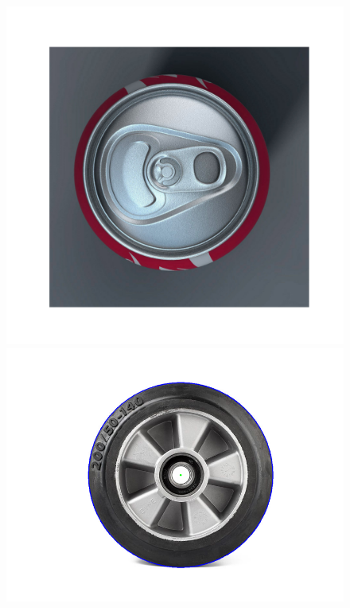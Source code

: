 \documentclass[a4paper,12pt]{article}
\begin{document}
\begin{figure}[H]
    \centering
    \begin{minipage}{0.48\textwidth}
        \centering
        \includegraphics[width=\textwidth]{images/hough_circles/1_orig_range.png}
    \end{minipage}
    \begin{minipage}{0.48\textwidth}
        \centering
        \includegraphics[width=\textwidth]{images/hough_circles/3_orig_range.png}

\end{minipage}
\end{figure}
\end{document}
